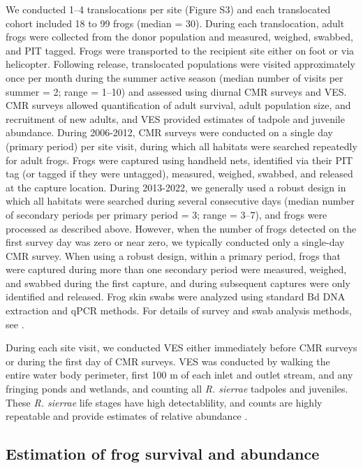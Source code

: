 \documentclass[9pt,twocolumn,twoside,lineno]{pnas-new}
\begin{document}
{We conducted 1--4 translocations per site (Figure S3)
and each translocated cohort included 18 to 99 frogs (median = 30).
During each translocation, adult frogs were collected from the donor
population and measured, weighed, swabbed, and PIT tagged. Frogs were
transported to the recipient site either on foot or via helicopter.
Following release, translocated populations were visited approximately
once per month during the summer active season (median number of visits
per summer = 2; range = 1--10) and assessed using diurnal CMR surveys
and VES. CMR surveys allowed quantification of adult survival, adult
population size, and recruitment of new adults, and VES provided
estimates of tadpole and juvenile abundance. During 2006-2012, CMR
surveys were conducted on a single day (primary period) per site visit,
during which all habitats were searched repeatedly for adult frogs.
Frogs were captured using handheld nets, identified via their PIT tag
(or tagged if they were untagged), measured, weighed, swabbed, and
released at the capture location. During 2013-2022, we generally used a
robust design in which all habitats were searched during several
consecutive days (median number of secondary periods per primary period
= 3; range = 3--7), and frogs were processed as described above.
However, when the number of frogs detected on the first survey day was
zero or near zero, we typically conducted only a single-day CMR survey.
When using a robust design, within a primary period, frogs that were
captured during more than one secondary period were measured, weighed,
and swabbed during the first capture, and during subsequent captures
were only identified and released. Frog skin swabs were analyzed using
standard Bd DNA extraction and qPCR methods. For details of survey and
swab analysis methods, see \citep{joseph2018}.

During each site visit, we conducted VES either immediately before CMR
surveys or during the first day of CMR surveys. VES was conducted by
walking the entire water body perimeter, first 100 m of each inlet and
outlet stream, and any fringing ponds and wetlands, and counting all
\emph{R. sierrae} tadpoles and juveniles. These \emph{R. sierrae} life
stages have high detectablility, and counts are highly repeatable and
provide estimates of relative abundance \citep{knapp2000}.

\hypertarget{estimation-of-frog-survival-and-abundance}{%
\subsection*{Estimation of frog survival and
abundance}\label{estimation-of-frog-survival-and-abundance}}

}
\end{document}

